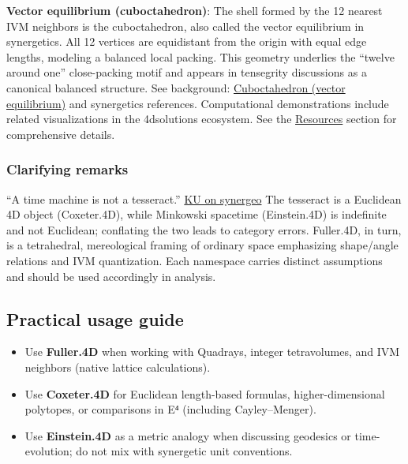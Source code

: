 \documentclass[
  10pt,
]{article}
\providecommand{\tightlist}{%
  \setlength{\itemsep}{0pt}\setlength{\parskip}{0pt}}
\begin{document}
\textbf{Vector equilibrium (cuboctahedron)}: The shell formed by the 12
nearest IVM neighbors is the cuboctahedron, also called the vector
equilibrium in synergetics. All 12 vertices are equidistant from the
origin with equal edge lengths, modeling a balanced local packing. This
geometry underlies the ``twelve around one'' close-packing motif and
appears in tensegrity discussions as a canonical balanced structure. See
background:
\href{https://en.wikipedia.org/wiki/Cuboctahedron}{Cuboctahedron (vector
equilibrium)} and synergetics references. Computational demonstrations
include related visualizations in the 4dsolutions ecosystem. See the
\href{07_resources.md}{Resources} section for comprehensive details.

\subsubsection{Clarifying remarks}\label{clarifying-remarks}

``A time machine is not a tesseract.''
\href{https://groups.io/g/synergeo/topic/my_take_on_close_pack/114531919}{KU
on synergeo} The tesseract is a Euclidean 4D object (Coxeter.4D), while
Minkowski spacetime (Einstein.4D) is indefinite and not Euclidean;
conflating the two leads to category errors. Fuller.4D, in turn, is a
tetrahedral, mereological framing of ordinary space emphasizing
shape/angle relations and IVM quantization. Each namespace carries
distinct assumptions and should be used accordingly in analysis.

\subsection{Practical usage guide}\label{practical-usage-guide}

\begin{itemize}
\tightlist
\item
  Use \textbf{Fuller.4D} when working with Quadrays, integer
  tetravolumes, and IVM neighbors (native lattice calculations).
\item
  Use \textbf{Coxeter.4D} for Euclidean length-based formulas,
  higher-dimensional polytopes, or comparisons in E⁴ (including
  Cayley--Menger).
\item
  Use \textbf{Einstein.4D} as a metric analogy when discussing geodesics
  or time-evolution; do not mix with synergetic unit conventions.
\end{itemize}

\newpage
\end{document}
